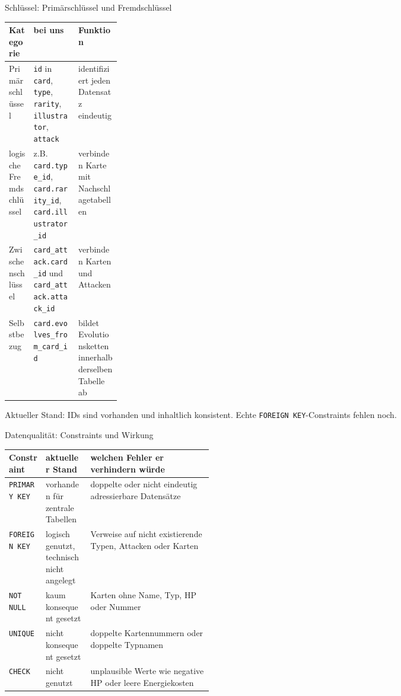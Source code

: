 \documentclass[aspectratio=169,11pt]{beamer}
\begin{document}
\begin{frame}[shrink=8]{Schl\"ussel: Prim\"arschl\"ussel und Fremdschl\"ussel}
  \begin{panel}
    \begin{tabularx}{\linewidth}{@{}L{0.22\linewidth}Y Y@{}}
      \toprule
      \textbf{Kategorie} & \textbf{bei uns} & \textbf{Funktion} \\
      \midrule
      Prim\"arschl\"ussel & \texttt{id} in \texttt{card}, \texttt{type}, \texttt{rarity}, \texttt{illustrator}, \texttt{attack} & identifiziert jeden Datensatz eindeutig \\
      logische Fremdschl\"ussel & z.B. \texttt{card.type\_id}, \texttt{card.rarity\_id}, \texttt{card.illustrator\_id} & verbinden Karte mit Nachschlagetabellen \\
      Zwischenschl\"ussel & \texttt{card\_attack.card\_id} und \texttt{card\_attack.attack\_id} & verbinden Karten und Attacken \\
      Selbstbezug & \texttt{card.evolves\_from\_card\_id} & bildet Evolutionsketten innerhalb derselben Tabelle ab \\
      \bottomrule
    \end{tabularx}
  \end{panel}
  \vspace{0.18cm}
  \small\color{muted}Aktueller Stand: IDs sind vorhanden und inhaltlich konsistent. Echte \texttt{FOREIGN KEY}-Constraints fehlen noch.
\end{frame}

\begin{frame}[shrink=8]{Datenqualit\"at: Constraints und Wirkung}
  \begin{panel}
    \begin{tabularx}{\linewidth}{@{}L{0.18\linewidth}L{0.22\linewidth}Y@{}}
      \toprule
      \textbf{Constraint} & \textbf{aktueller Stand} & \textbf{welchen Fehler er verhindern w\"urde} \\
      \midrule
      \texttt{PRIMARY KEY} & vorhanden f\"ur zentrale Tabellen & doppelte oder nicht eindeutig adressierbare Datens\"atze \\
      \texttt{FOREIGN KEY} & logisch genutzt, technisch nicht angelegt & Verweise auf nicht existierende Typen, Attacken oder Karten \\
      \texttt{NOT NULL} & kaum konsequent gesetzt & Karten ohne Name, Typ, HP oder Nummer \\
      \texttt{UNIQUE} & nicht konsequent gesetzt & doppelte Kartennummern oder doppelte Typnamen \\
      \texttt{CHECK} & nicht genutzt & unplausible Werte wie negative HP oder leere Energiekosten \\
      \bottomrule
    \end{tabularx}
  \end{panel}
\end{frame}
\end{document}
